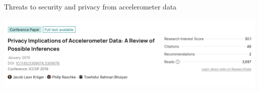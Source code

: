 \documentclass[ucs,9pt]{beamer}
\begin{document}
\begin{frame}[fragile]{Threats to security and privacy from accelerometer data}
	
	\includegraphics[width=1\linewidth]{imgs/Privacy Implications of Accelerometer Data A Review of Possible Inferences}
	
\end{frame}
\end{document}
